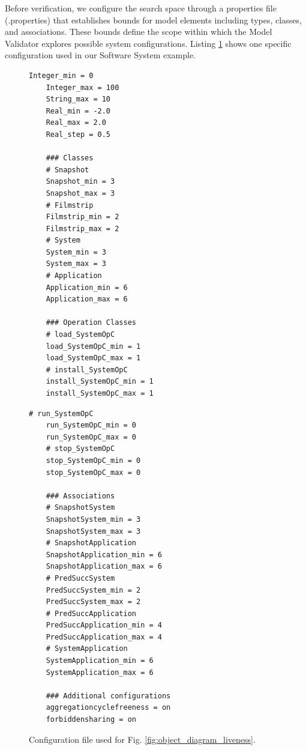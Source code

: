Before verification, we configure the search space through a properties file 
(.properties) that establishes bounds for model elements including types, classes, 
and associations. These bounds define the scope within which the Model Validator 
explores possible system configurations. Listing \ref{lst:configuration_file} shows 
one specific configuration used in our Software System example.

\begin{figure}[htbp]
    \begin{minipage}[t]{0.48\textwidth}
    \begin{lstlisting}[basicstyle=\ttfamily\scriptsize, frame=single]
    Integer_min = 0
    Integer_max = 100
    String_max = 10
    Real_min = -2.0
    Real_max = 2.0
    Real_step = 0.5
    
    ### Classes
    # Snapshot
    Snapshot_min = 3
    Snapshot_max = 3
    # Filmstrip
    Filmstrip_min = 2
    Filmstrip_max = 2
    # System
    System_min = 3
    System_max = 3
    # Application
    Application_min = 6
    Application_max = 6
    
    ### Operation Classes
    # load_SystemOpC
    load_SystemOpC_min = 1
    load_SystemOpC_max = 1
    # install_SystemOpC
    install_SystemOpC_min = 1
    install_SystemOpC_max = 1
    \end{lstlisting}
    \end{minipage}
    \hfill
    \begin{minipage}[t]{0.48\textwidth}
    \begin{lstlisting}[basicstyle=\ttfamily\scriptsize, frame=single]
    # run_SystemOpC
    run_SystemOpC_min = 0
    run_SystemOpC_max = 0
    # stop_SystemOpC
    stop_SystemOpC_min = 0
    stop_SystemOpC_max = 0
    
    ### Associations
    # SnapshotSystem
    SnapshotSystem_min = 3
    SnapshotSystem_max = 3
    # SnapshotApplication
    SnapshotApplication_min = 6
    SnapshotApplication_max = 6
    # PredSuccSystem
    PredSuccSystem_min = 2
    PredSuccSystem_max = 2
    # PredSuccApplication
    PredSuccApplication_min = 4
    PredSuccApplication_max = 4
    # SystemApplication
    SystemApplication_min = 6
    SystemApplication_max = 6
    
    ### Additional configurations
    aggregationcyclefreeness = on
    forbiddensharing = on
    \end{lstlisting}
    \end{minipage}
    \caption{Configuration file used for Fig. \ref{fig:object_diagram_liveness}.}
    \label{lst:configuration_file}
\end{figure}

